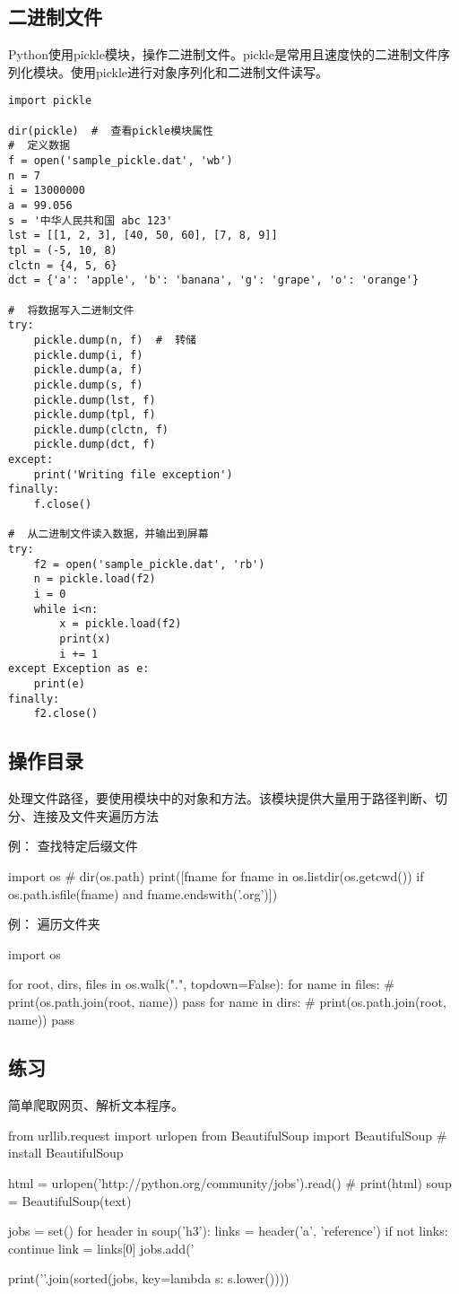\subsection{二进制文件}
Python使用pickle模块，操作二进制文件。pickle是常用且速度快的二进制文件序列化模块。使用pickle进行对象序列化和二进制文件读写。
\begin{verbatim}
import pickle

dir(pickle)  #  查看pickle模块属性
#  定义数据
f = open('sample_pickle.dat', 'wb')
n = 7
i = 13000000
a = 99.056
s = '中华人民共和国 abc 123'
lst = [[1, 2, 3], [40, 50, 60], [7, 8, 9]]
tpl = (-5, 10, 8)
clctn = {4, 5, 6}
dct = {'a': 'apple', 'b': 'banana', 'g': 'grape', 'o': 'orange'}

#  将数据写入二进制文件
try:
    pickle.dump(n, f)  #  转储
    pickle.dump(i, f)
    pickle.dump(a, f)
    pickle.dump(s, f)
    pickle.dump(lst, f)
    pickle.dump(tpl, f)
    pickle.dump(clctn, f)
    pickle.dump(dct, f)
except:
    print('Writing file exception')
finally:
    f.close()

#  从二进制文件读入数据，并输出到屏幕
try:
    f2 = open('sample_pickle.dat', 'rb')
    n = pickle.load(f2)
    i = 0
    while i<n:
        x = pickle.load(f2)
        print(x)
        i += 1
except Exception as e:
    print(e)
finally:
    f2.close()
\end{verbatim}
\subsection{操作目录}
处理文件路径，要使用模块中的对象和方法。该模块提供大量用于路径判断、切分、连接及文件夹遍历方法

例： 查找特定后缀文件
\begin{python}
import os
# dir(os.path)
print([fname for fname in os.listdir(os.getcwd()) if os.path.isfile(fname) and fname.endswith('.org')])
\end{python}
例： 遍历文件夹
\begin{python}
import os

for root, dirs, files in os.walk(".", topdown=False):
    for name in files:
        #  print(os.path.join(root, name))
        pass
    for name in dirs:
        #  print(os.path.join(root, name))
        pass
\end{python}

\subsection{练习}
简单爬取网页、解析文本程序。
\begin{python}
from urllib.request import urlopen
from BeautifulSoup import BeautifulSoup  # install BeautifulSoup

html = urlopen('http://python.org/community/jobs').read()
# print(html)
soup = BeautifulSoup(text)

jobs = set()
for header in soup('h3'):
    links = header('a', 'reference')
    if not links: 
        continue
    link = links[0]
    jobs.add('%

print('\n'.join(sorted(jobs, key=lambda s: s.lower())))
\end{python}
